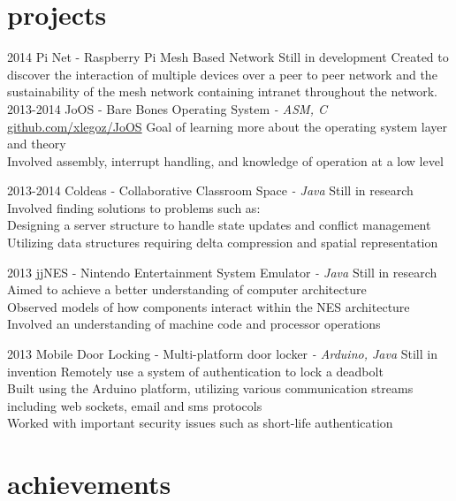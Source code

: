 \documentclass[]{friggeri-cv}
\begin{document}
\section{projects}

\begin{entrylist}
  \entry
  	{2014}
  	{Pi Net \textsf{- Raspberry Pi Mesh Based Network}}
  	{Still in development}
  	{Created to discover the interaction of multiple devices over a peer to peer network and the sustainability of the mesh network containing intranet throughout the network.}
  \entry
    {2013-2014}
    {JoOS \textsf{- Bare Bones Operating System \em{- ASM, C}}}
    {\href{http://github.com/xlegoz/JoOS}{github.com/xlegoz/JoOS}}
    {Goal of learning more about the operating system layer and theory \\
    Involved assembly, interrupt handling, and knowledge of operation at a low level}
    
  \entry
  	{2013-2014}
  	{Coldeas \textsf{- Collaborative Classroom Space \em{- Java}}}
  	{Still in research}
  	{Involved finding solutions to problems such as: \\
	Designing a server structure to handle state updates and conflict management \\
  	Utilizing data structures requiring delta compression and spatial representation}
 
  \entry
  	{2013}
  	{jjNES \textsf{- Nintendo Entertainment System Emulator \em{- Java}}}
  	{Still in research}
  	{Aimed to achieve a better understanding of computer architecture \\
  	Observed models of how components interact within the NES architecture \\
  	Involved an understanding of machine code and processor operations}
  	 
  
  \entry
  	{2013}
  	{Mobile Door Locking \textsf{- Multi-platform door locker \em{- Arduino, Java}}}
  	{Still in invention}
  	{Remotely use a system of authentication to lock a deadbolt \\
  	Built using the Arduino platform, utilizing various communication streams including web sockets, email and sms protocols \\
  	Worked with important security issues such as short-life authentication}
\end{entrylist}

\section{achievements}
\end{document}
